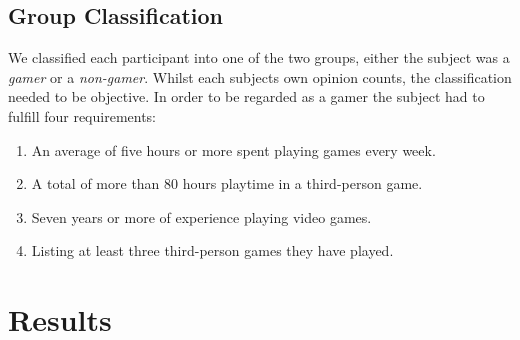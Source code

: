 \documentclass[runningheads,a4paper,oribibl]{llncs}
\begin{document}
\subsection{Group Classification} \label{subsec:GroupClassification}
We classified each participant into one of the two groups, either the subject was a \emph{gamer} or a \emph{non-gamer}. Whilst each subjects own opinion counts, the classification needed to be objective. In order to be regarded as a gamer the subject had to fulfill four requirements:
\begin{enumerate}
   \item An average of five hours or more spent playing games every week. 
   \item A total of more than 80 hours playtime in a third-person game.
   \item Seven years or more of experience playing video games.
   \item Listing at least three third-person games they have played.
\end{enumerate}


%





















\section{Results}

\end{document}
